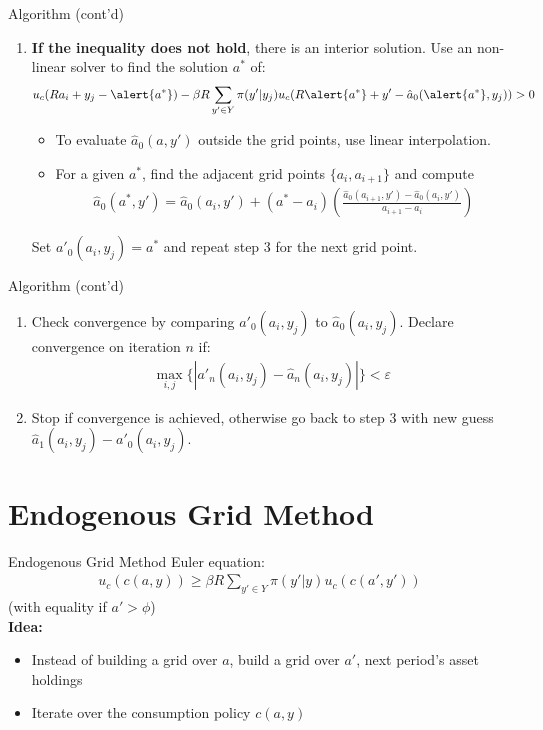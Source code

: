 \documentclass{beamer}
\begin{document}
\begin{frame}{Algorithm (cont'd)}
\begin{enumerate}
\resume
\item \textbf{If the inequality does not hold}, there is an interior solution. Use an non-linear solver to find the solution $a^*$ of:
\begin{align*}
u_c(Ra_i + y_j - \alert{a^*}) - \beta R \displaystyle \sum_{y' \in Y} \pi(y'|y_j) u_c(R\alert{a^*} + y' - \hat{a}_0(\alert{a^*}, y_j)) > 0
\end{align*} 
\begin{itemize}
\item To evaluate $\hat{a}_0(a, y')$ outside the grid points, use linear interpolation.
\item For a given $a^*$, find the adjacent grid points $\{a_i, a_{i+1}\}$ and compute
\begin{align*}
\hat{a}_0(a^*, y') = \hat{a}_0(a_i, y') + (a^* - a_i) \left( \frac{\hat{a}_0(a_{i+1}, y') - \hat{a}_0(a_i, y')}{a_{i+1} - {a_i}} \right)
\end{align*} 
\end{itemize}
Set $a'_0(a_i, y_j) = a^*$ and repeat step 3 for the next grid point.
\saveenum
\end{enumerate}
\end{frame}

\begin{frame}{Algorithm (cont'd)}
\begin{enumerate}
\resume
\item Check convergence by comparing $a'_0(a_i, y_j)$ to $\hat{a}_0(a_i, y_j)$. Declare convergence on iteration $n$ if:
\begin{align*}
\max_{i, j} \{|a'_n(a_i, y_j) - \hat{a}_n(a_i, y_j)| \} < \varepsilon
\end{align*}
\item Stop if convergence is achieved, otherwise go back to step 3 with new guess $\hat{a}_1(a_i, y_j) - a'_0(a_i, y_j)$.
\saveenum
\end{enumerate}
\end{frame}

\section{Endogenous Grid Method}

\begin{frame}{Endogenous Grid Method}
Euler equation:
\begin{align*}
u_c(c(a, y)) \geq \beta R \displaystyle \sum_{y' \in Y} \pi(y'|y) u_c(c(a', y'))
\end{align*}
(with equality if $a' > \phi$) \\ \vspace{5mm}
\textbf{Idea:}
\begin{itemize}
\item Instead of building a grid over $a$, build a grid over $a'$, next period's asset holdings
\item Iterate over the consumption policy $c(a, y)$
\end{itemize}
\end{frame}
\end{document}
